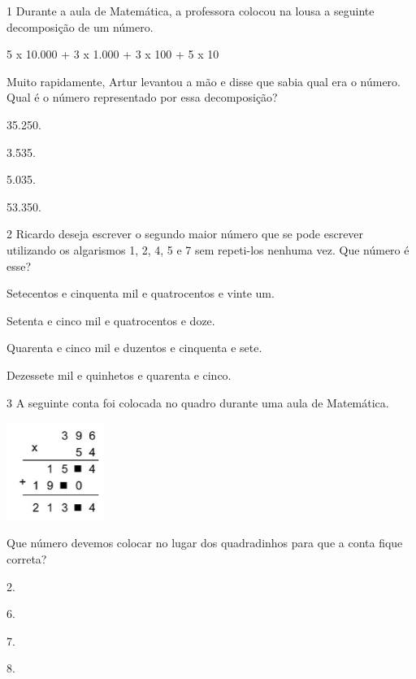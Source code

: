 \begin{mdframed}[linewidth=2pt,linecolor=salmao,roundcorner=2pt]
\begin{escolha}
{\begin{escolha}
\num{1} Durante a aula de Matemática, a professora colocou na lousa a seguinte
decomposição de um número.

\begin{mdframed}[linewidth=2pt,linecolor=azul!20,backgroundcolor=azul!20,roundcorner=2pt]
5 x 10.000 + 3 x 1.000 + 3 x 100 + 5 x 10
\end{mdframed}

Muito rapidamente, Artur levantou a mão e disse que sabia qual era o
número. Qual é o número representado por essa decomposição?

\begin{escolha}
\item
  35.250.
\item
  3.535.
\item
  5.035.
\item
  53.350.
\end{escolha}


\num{2} Ricardo deseja escrever o segundo maior número que se pode escrever
utilizando os algarismos 1, 2, 4, 5 e 7 sem repeti-los nenhuma vez.
Que número é esse?

\begin{escolha}
\item
  Setecentos e cinquenta mil e quatrocentos e vinte um.
\item
  Setenta e cinco mil e quatrocentos e doze.
\item
  Quarenta e cinco mil e duzentos e cinquenta e sete.
\item
  Dezessete mil e quinhetos e quarenta e cinco.
\end{escolha}


\num{3} A seguinte conta foi colocada no quadro durante uma aula de Matemática.

\includegraphics[width=1.26282in,height=1.25762in]{media/image159.png}

Que número devemos colocar no lugar dos quadradinhos para que a conta
fique correta?

\begin{escolha}
\item
  2.
\item
  6.
\item
  7.
\item
  8.
\end{escolha}



\end{escolha}}
\end{escolha}
\end{mdframed}
